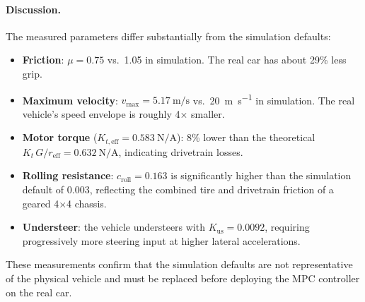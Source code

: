 \documentclass[11pt,a4paper]{article}
\begin{document}
\paragraph{Discussion.}
The measured parameters differ substantially from the simulation
defaults:
\begin{itemize}
    \item \textbf{Friction}: $\mu = 0.75$ vs.\ 1.05 in simulation.
      The real car has about 29\% less grip.
  \item \textbf{Maximum velocity}: $v_\text{max} = \SI{5.17}{\metre\per\second}$
        vs.\ \SI{20}{\metre\per\second} in simulation.  The real vehicle's
        speed envelope is roughly 4$\times$ smaller.
  \item \textbf{Motor torque} ($K_{t,\text{eff}} = \SI{0.583}{\newton\per\ampere}$):
        8\% lower than the theoretical
        $K_t\,G/r_\text{eff} = \SI{0.632}{\newton\per\ampere}$, indicating
        drivetrain losses.
  \item \textbf{Rolling resistance}: $c_\text{roll} = 0.163$ is
        significantly higher than the simulation default of 0.003,
        reflecting the combined tire and drivetrain friction of a geared
        4$\times$4 chassis.
  \item \textbf{Understeer}: the vehicle understeers with
        $K_\text{us} = 0.0092$, requiring progressively more steering
        input at higher lateral accelerations.
\end{itemize}

These measurements confirm that the simulation defaults are not
representative of the physical vehicle and must be replaced before
deploying the MPC controller on the real car.
\end{document}

